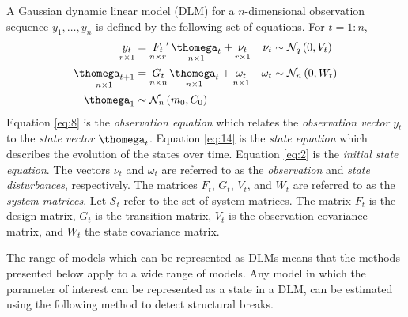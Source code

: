 \documentclass{article}
\begin{document}
A Gaussian dynamic linear model (DLM) for a $n$-dimensional observation sequence $y_{1}, \dots, y_{n}$ is defined by the following set of equations.%
For $t = 1:n$,
\begin{align}
  \label{eq:8}
  \underset{r \times 1}{y_t} &= \underset{n \times r}{F_{t}}' \, \underset{n \times 1}{\thomega_t} + \underset{r \times 1}{\nu_t} & \nu_{t} &\sim \dmvnorm{0, V_{t}}{q} \\
  \label{eq:14}
  \underset{n \times 1}{\thomega_{t+1}} &= \underset{n \times n}{G_{t}} \, \underset{n \times 1}{\thomega_{t}} + \underset{n \times 1}{\omega_{t}} & \omega_{t} &\sim \dmvnorm{0, W_{t}}{n} \\
  \label{eq:2}
  \thomega_{1} & \sim \dmvnorm{m_{0}, C_{0}}{n}
\end{align}
Equation \eqref{eq:8} is the \textit{observation equation} which relates the \textit{observation vector} $y_{t}$ to the \textit{state vector} $\thomega_{t}$.
Equation \eqref{eq:14} is the \textit{state equation} which describes the evolution of the states over time.
Equation \eqref{eq:2} is the \textit{initial state equation}.
The vectors $\nu_{t}$ and $\omega_{t}$ are referred to as the \textit{observation} and \textit{state disturbances}, respectively.
The matrices $F_{t}$, $G_{t}$, $V_{t}$, and $W_{t}$ are referred to as the \textit{system matrices}.
Let $\mathcal{S}_{t}$ refer to the set of system matrices.
The matrix $F_{t}$ is the design matrix, $G_{t}$ is the transition matrix, $V_{t}$ is the observation covariance matrix, and $W_{t}$ the state covariance matrix.

The range of models which can be represented as DLMs means that the methods presented below apply to a wide range of models.
Any model in which the parameter of interest can be represented as a state in a DLM, can be estimated using the following method to detect structural breaks.
\end{document}

